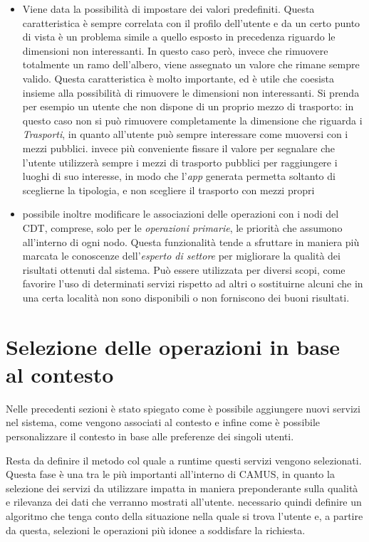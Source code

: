\begin{itemize}
	\item
	Viene data la possibilità di impostare dei valori predefiniti. Questa caratteristica è sempre correlata con il profilo dell'utente e da un certo punto di vista è un problema simile a quello esposto in precedenza riguardo le dimensioni non interessanti. In questo caso però, invece che rimuovere totalmente un ramo dell'albero, viene assegnato un valore che rimane sempre valido. Questa caratteristica è molto importante, ed è utile che coesista insieme alla possibilità di rimuovere le dimensioni non interessanti. Si prenda per esempio un utente che non dispone di un proprio mezzo di trasporto: in questo caso non si può rimuovere completamente la dimensione che riguarda i \emph{Trasporti}, in quanto all'utente può sempre interessare come muoversi con i mezzi pubblici. \upe invece più conveniente fissare il valore  per segnalare che l'utente utilizzerà sempre i mezzi di trasporto pubblici per raggiungere i luoghi di suo interesse, in modo che l'\emph{app} generata permetta soltanto di sceglierne la tipologia, e non scegliere il trasporto con mezzi propri
	\item
	\upe possibile inoltre modificare le associazioni delle operazioni con i nodi del CDT, comprese, solo per le \emph{operazioni primarie}, le priorità che assumono all'interno di ogni nodo. Questa funzionalità tende a sfruttare in maniera più marcata le conoscenze dell'\emph{esperto di settore} per migliorare la qualità dei risultati ottenuti dal sistema. Può essere utilizzata per diversi scopi, come favorire l'uso di determinati servizi rispetto ad altri o sostituirne alcuni che in una certa località non sono disponibili o non forniscono dei buoni risultati.
\end{itemize}

\section{Selezione delle operazioni in base al contesto\label{sec:selezione-operazioni}}

Nelle precedenti sezioni è stato spiegato come è possibile aggiungere nuovi servizi nel sistema, come vengono associati al contesto e infine come è possibile personalizzare il contesto in base alle preferenze dei singoli utenti.

Resta da definire il metodo col quale a runtime questi servizi vengono selezionati. Questa fase è una tra le più importanti all'interno di CAMUS, in quanto la selezione dei servizi da utilizzare impatta in maniera preponderante sulla qualità e rilevanza dei dati che verranno mostrati all'utente. \upe necessario quindi definire un algoritmo che tenga conto della situazione nella quale si trova l'utente e, a partire da questa, selezioni le operazioni più idonee a soddisfare la richiesta. 

